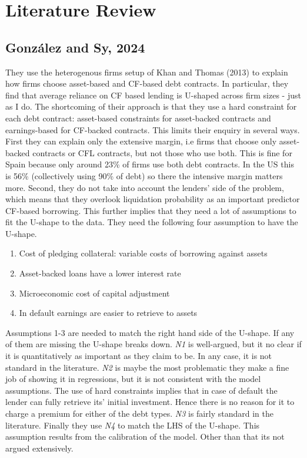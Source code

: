 \documentclass[12pt]{article}
\begin{document}
\section*{Literature Review}
\subsection*{González and Sy, 2024 \checkmark}
They use the heterogenous firms setup of Khan and Thomas (2013) to explain how firms choose asset-based and CF-based debt contracts. In particular, they find that average reliance on CF based lending is U-shaped across firm sizes - just as I do. The shortcoming of their approach is that they use a hard constraint for each debt contract: asset-based constraints for asset-backed contracts and earnings-based for CF-backed contracts. This limits their enquiry in several ways. First they can explain only the extensive margin, i.e firms that choose only asset-backed contracts or CFL contracts, but not those who use both. This is fine for Spain because only around 23\% of firms use both debt contracts. In the US this is 56\% (collectively using 90\% of debt) so there the intensive margin matters more. Second, they do not take into account the lenders' side of the problem, which means that they overlook liquidation probability as an important predictor CF-based borrowing. This further implies that they need a lot of assumptions to fit the U-shape to the data. They need the following four assumption to have the U-shape. 
\begin{enumerate} \setlength\itemsep{0em} 
    \item Cost of pledging collateral: variable costs of borrowing against assets
    \item Asset-backed loans have a lower interest rate 
    \item Microeconomic cost of capital adjustment
    \item In default earnings are easier to retrieve to assets
\end{enumerate}
Assumptions 1-3 are needed to match the right hand side of the U-shape. If any of them are missing the U-shape breaks down. \textit{N1} is well-argued, but it no clear if it is quantitatively as important as they claim to be. In any case, it is not standard in the literature. \textit{N2} is maybe the most problematic they make a fine job of showing it in regressions, but it is not consistent with the model assumptions. The use of hard constraints implies that in case of default the lender can fully retrieve its' initial investment. Hence there is no reason for it to charge a premium for either of the debt types. \textit{N3} is fairly standard in the literature. Finally they use \textit{N4} to match the LHS of the U-shape. This assumption results from the calibration of the model. Other than that its not argued extensively. \vspace{3mm} \\
\end{document}
